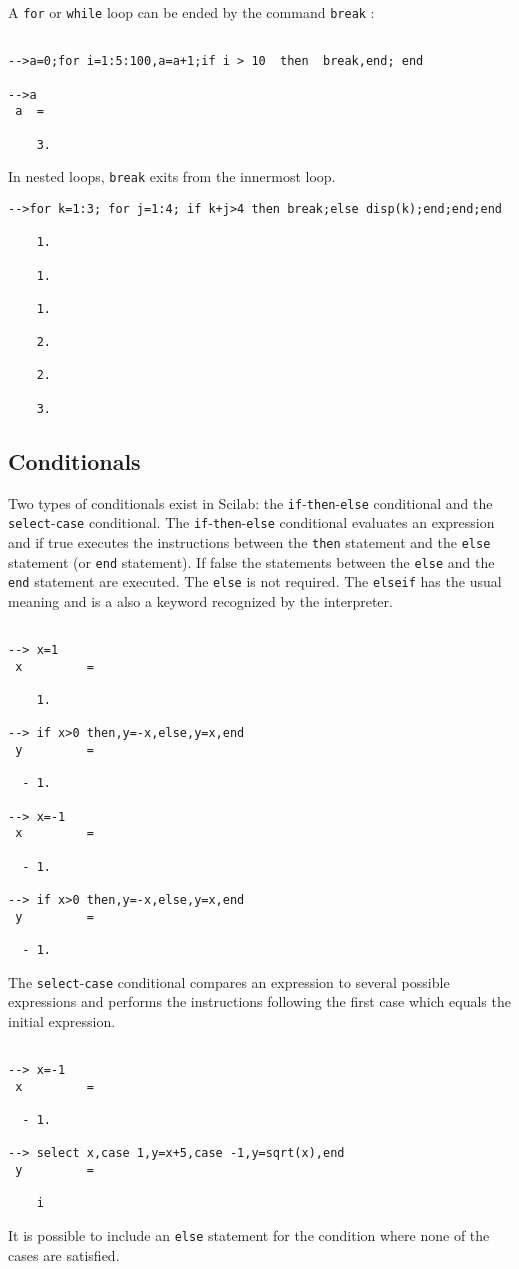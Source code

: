  A {\tt for} or {\tt while} loop can be ended by the command {\tt break} :
\begin{verbatim}

-->a=0;for i=1:5:100,a=a+1;if i > 10  then  break,end; end
 
-->a
 a  =
 
    3.  

\end{verbatim}
In nested loops, {\tt break} exits from the innermost loop.

\begin{verbatim}
-->for k=1:3; for j=1:4; if k+j>4 then break;else disp(k);end;end;end
 
    1.  
 
    1.  
 
    1.  
 
    2.  
 
    2.  
 
    3. 
\end{verbatim}
\subsection{Conditionals}
Two types of conditionals exist in Scilab: the 
{\tt if}-{\tt then}-{\tt else}
conditional and the 
{\tt select}-{\tt case} 
conditional.  The 
{\tt if}-{\tt then}-{\tt else} conditional
evaluates an expression and if true executes the
instructions between the {\tt then} statement and the {\tt else} statement
(or {\tt end} statement).
If false the statements between the {\tt else} and the {\tt end}
statement are executed.  The {\tt else} is not required. The {\tt elseif}
has the usual meaning and is a also a keyword recognized by the interpreter.
\begin{verbatim}
 
--> x=1
 x         =
 
    1.  
 
--> if x>0 then,y=-x,else,y=x,end
 y         =
 
  - 1.  
 
--> x=-1
 x         =
 
  - 1.  
 
--> if x>0 then,y=-x,else,y=x,end
 y         =
 
  - 1.  
\end{verbatim}


        The {\tt select}-{\tt case} conditional
compares an expression to several possible expressions and performs the
instructions following the first case which equals the initial expression.
\begin{verbatim}
 
--> x=-1
 x         =
 
  - 1.  
 
--> select x,case 1,y=x+5,case -1,y=sqrt(x),end
 y         =
 
    i    
\end{verbatim}
It is possible to include an {\tt else} statement for the condition
where none of the cases are satisfied.


